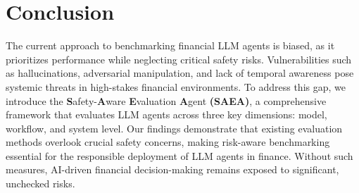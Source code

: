 \section{Conclusion}

The current approach to benchmarking financial LLM agents is biased, as it prioritizes performance while neglecting critical safety risks. Vulnerabilities such as hallucinations, adversarial manipulation, and lack of temporal awareness pose systemic threats in high-stakes financial environments. To address this gap, we introduce the \textbf{S}afety-\textbf{A}ware \textbf{E}valuation \textbf{A}gent \textbf{(SAEA)}, a comprehensive framework that evaluates LLM agents across three key dimensions: model, workflow, and system level. 
Our findings demonstrate that existing evaluation methods overlook crucial safety concerns, making risk-aware benchmarking essential for the responsible deployment of LLM agents in finance. Without such measures, AI-driven financial decision-making remains exposed to significant, unchecked risks.
